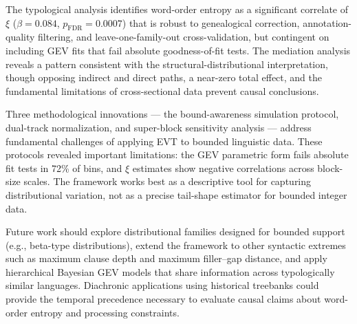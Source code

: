 \documentclass[11pt,letterpaper]{article}
\begin{document}
The typological analysis identifies word-order entropy as a significant correlate of $\xi$ ($\beta = 0.084$, $p_{\text{FDR}} = 0.0007$) that is robust to genealogical correction, annotation-quality filtering, and leave-one-family-out cross-validation, but contingent on including GEV fits that fail absolute goodness-of-fit tests. The mediation analysis reveals a pattern consistent with the structural-distributional interpretation, though opposing indirect and direct paths, a near-zero total effect, and the fundamental limitations of cross-sectional data prevent causal conclusions.

Three methodological innovations --- the bound-awareness simulation protocol, dual-track normalization, and super-block sensitivity analysis --- address fundamental challenges of applying EVT to bounded linguistic data. These protocols revealed important limitations: the GEV parametric form fails absolute fit tests in 72\% of bins, and $\xi$ estimates show negative correlations across block-size scales. The framework works best as a descriptive tool for capturing distributional variation, not as a precise tail-shape estimator for bounded integer data.

Future work should explore distributional families designed for bounded support (e.g., beta-type distributions), extend the framework to other syntactic extremes such as maximum clause depth and maximum filler--gap distance, and apply hierarchical Bayesian GEV models that share information across typologically similar languages. Diachronic applications using historical treebanks could provide the temporal precedence necessary to evaluate causal claims about word-order entropy and processing constraints.



\end{document}
